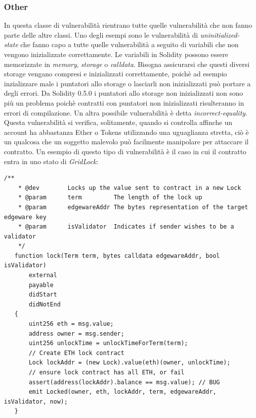 \documentclass[../../Thesis.tex]{subfiles}
\begin{document}
\subsubsection{Other}
In questa classe di vulnerabilità rientrano tutte quelle vulnerabilità che non fanno parte delle altre classi. Uno degli esempi sono le vulnerabilità di \emph{uninitialized-state} che fanno capo a tutte quelle vulnerabilità a seguito di variabili che non vengono inizializzate correttamente. Le variabili in Solidity possono essere memorizzate in \emph{memory}, \emph{storage} o \emph{calldata}. Bisogna assicurarsi che questi diversi storage vengano compresi e inizializzati correttamente, poichè ad esempio inzializzare male i puntatori allo storage o lasciarli non inizializzati può portare a degli errori. Da Solidity 0.5.0 i puntatori allo storage non inizializzati non sono più un problema poichè contratti con puntatori non inizializzati risulteranno in errori di compilazione.  
Un altra possibile vulnerabilità è detta \emph{incorrect-equality}. Questa vulnerabilità si verifica, solitamente, quando si controlla affinche un account ha abbastanza Ether o Tokens utilizzando una uguaglianza stretta, ciò è un qualcosa che un soggetto malevolo può facilmente manipolare per attaccare il contratto. Un esempio di questo tipo di vulnerabilità è il caso in cui il contratto entra in uno stato di \emph{GridLock}:
\begin{lstlisting}[language=Solidity]
    /**
    * @dev        Locks up the value sent to contract in a new Lock
    * @param      term         The length of the lock up
    * @param      edgewareAddr The bytes representation of the target edgeware key
    * @param      isValidator  Indicates if sender wishes to be a validator
    */
   function lock(Term term, bytes calldata edgewareAddr, bool isValidator)
       external
       payable
       didStart
       didNotEnd
   {
       uint256 eth = msg.value;
       address owner = msg.sender;
       uint256 unlockTime = unlockTimeForTerm(term);
       // Create ETH lock contract
       Lock lockAddr = (new Lock).value(eth)(owner, unlockTime);
       // ensure lock contract has all ETH, or fail
       assert(address(lockAddr).balance == msg.value); // BUG
       emit Locked(owner, eth, lockAddr, term, edgewareAddr, isValidator, now);
   }
\end{lstlisting}
\end{document}
